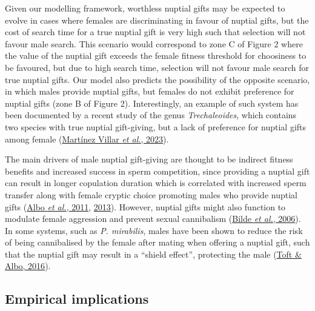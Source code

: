 \documentclass[
]{article}
\begin{document}
Given our modelling framework, worthless nuptial gifts may be expected
to evolve in cases where females are discriminating in favour of nuptial
gifts, but the cost of search time for a true nuptial gift is very high
such that selection will not favour male search. This scenario would
correspond to zone C of Figure 2 where the value of the nuptial gift
exceeds the female fitness threshold for choosiness to be favoured, but
due to high search time, selection will not favour male search for true
nuptial gifts. Our model also predicts the possibility of the opposite
scenario, in which males provide nuptial gifts, but females do not
exhibit preference for nuptial gifts (zone B of Figure 2).
Interestingly, an example of such system has been documented by a recent
study of the genus \emph{Trechaleoides}, which contains two species with
true nuptial gift-giving, but a lack of preference for nuptial gifts
among female (\protect\hyperlink{ref-Martinez2023}{Martínez Villar
\emph{et al.}, 2023}).

The main drivers of male nuptial gift-giving are thought to be indirect
fitness benefits and increased success in sperm competition, since
providing a nuptial gift can result in longer copulation duration which
is correlated with increased sperm transfer along with female cryptic
choice promoting males who provide nuptial gifts
(\protect\hyperlink{ref-Albo2011}{Albo \emph{et al.}, 2011},
\protect\hyperlink{ref-Albo2013}{2013}). However, nuptial gifts might
also function to modulate female aggression and prevent sexual
cannibalism (\protect\hyperlink{ref-Bilde2006}{Bilde \emph{et al.},
2006}). In some systems, such as \emph{P. mirabilis}, males have been
shown to reduce the risk of being cannibalised by the female after
mating when offering a nuptial gift, such that the nuptial gift may
result in a ``shield effect'', protecting the male
(\protect\hyperlink{ref-Toft2016}{Toft \& Albo, 2016}).

\hypertarget{empirical-implications}{%
\subsection{Empirical implications}\label{empirical-implications}}
\end{document}
